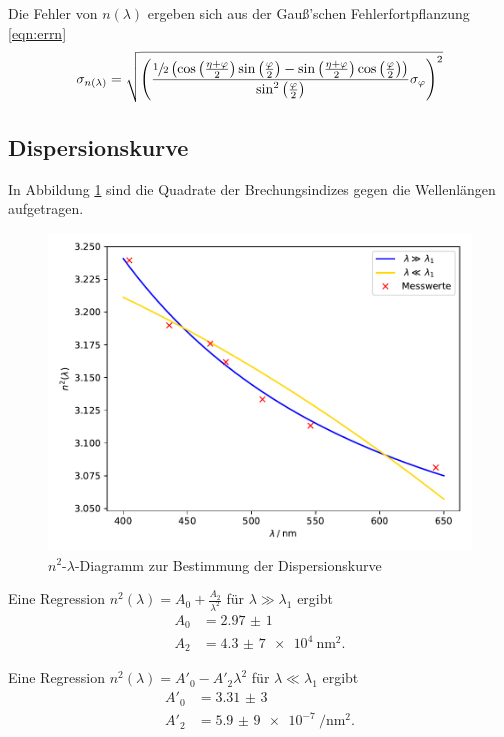Die Fehler von $n(\lambda)$ ergeben sich aus der Gauß'schen Fehlerfortpflanzung \eqref{eqn:errn}
\begin{equation}
  \sigma_{n(\lambda)} = \sqrt{\left( \frac{\sfrac{1}{2} \left( \cos{\left(\frac{\eta + \varphi}{2} \right)} \sin{\left(\frac{\varphi}{2} \right)} - \sin{\left( \frac{\eta + \varphi}{2} \right)} \cos{\left( \frac{\varphi}{2} \right)} \right)}{\sin^2{\left( \frac{\varphi}{2} \right)}} \sigma_{\varphi} \right)^2}
  \label{eqn:errn}
\end{equation}

\subsection{Dispersionskurve \label{sec:dis}}

In Abbildung \ref{fig:n} sind die Quadrate der Brechungsindizes gegen die Wellenlängen aufgetragen.
\begin{figure}[H]
  \centering
  \includegraphics[width=\textwidth]{Plots/n.pdf}
  \caption{$n^2$-$\lambda$-Diagramm zur Bestimmung der Dispersionskurve}
  \label{fig:n}
\end{figure}

Eine Regression $n^2(\lambda) = A_0 + \frac{A_2}{\lambda^2}$ für $\lambda \gg \lambda_1$ ergibt
\begin{align*}
  A_0 &= \SI{2,97(1)}{} \\
  A_2 &= \SI{4,3(7)e4}{\nm \squared}.
\end{align*}

Eine Regression $n^2(\lambda) = A'_0 - A'_2 \lambda^2$ für $\lambda \ll \lambda_1$ ergibt
\begin{align*}
  A'_0 &= \SI{3,31(3)}{} \\
  A'_2 &= \SI{5,9(9)e-7}{\per \nm \squared}.
\end{align*}

